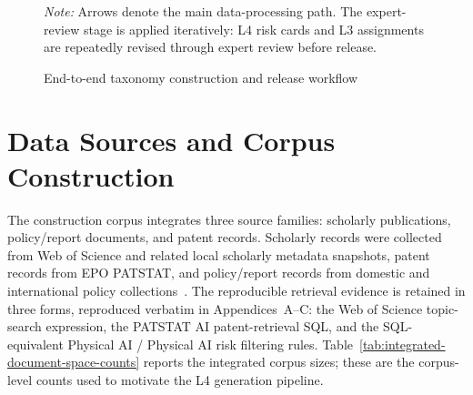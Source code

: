 \documentclass[11pt]{article}
\newcommand{\fignote}[1]{\par\vspace{0.25em}\noindent\begin{minipage}{\linewidth}\footnotesize\textit{Note:} #1\end{minipage}}
\begin{document}
\begin{figure}[htbp]
{%
}
\caption{End-to-end taxonomy construction and release workflow}
\label{fig:workflow}
\fignote{Arrows denote the main data-processing path. The expert-review stage is applied iteratively: L4 risk cards and L3 assignments are repeatedly revised through expert review before release.}
\end{figure}

\section{Data Sources and Corpus Construction}

The construction corpus integrates three source families: scholarly publications, policy/report documents, and patent records. Scholarly records were collected from Web of Science and related local scholarly metadata snapshots, patent records from EPO PATSTAT, and policy/report records from domestic and international policy collections~\cite{clarivate-wos,openalex,epo-patstat}. The reproducible retrieval evidence is retained in three forms, reproduced verbatim in Appendices~A--C: the Web of Science topic-search expression, the PATSTAT AI patent-retrieval SQL, and the SQL-equivalent Physical AI / Physical AI risk filtering rules. Table~\ref{tab:integrated-document-space-counts} reports the integrated corpus sizes; these are the corpus-level counts used to motivate the L4 generation pipeline.
\end{document}
